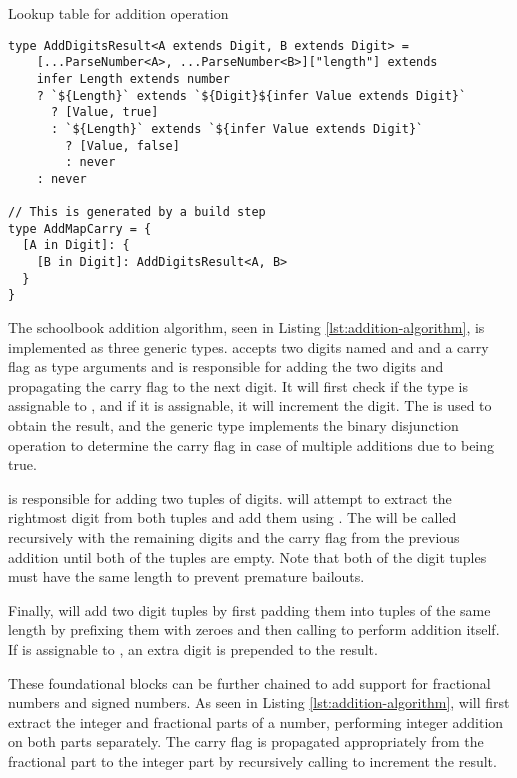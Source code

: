 \begin{listing}[ht]
  \caption{Lookup table for addition operation}\label{lst:generated-operations}
  \begin{verbatim}
type AddDigitsResult<A extends Digit, B extends Digit> =
    [...ParseNumber<A>, ...ParseNumber<B>]["length"] extends 
    infer Length extends number
    ? `${Length}` extends `${Digit}${infer Value extends Digit}`
      ? [Value, true]
      : `${Length}` extends `${infer Value extends Digit}`
        ? [Value, false]
        : never
    : never

// This is generated by a build step
type AddMapCarry = {
  [A in Digit]: {
    [B in Digit]: AddDigitsResult<A, B>
  }
}
\end{verbatim}
\end{listing}

The schoolbook addition algorithm, seen in Listing \ref{lst:addition-algorithm}, is implemented as three generic types.  accepts two digits named  and  and a carry flag as type arguments and is responsible for adding the two digits and propagating the carry flag to the next digit. It will first check if the  type is assignable to , and if it is assignable, it will increment the  digit. The  is used to obtain the result, and the  generic type implements the binary disjunction operation to determine the carry flag in case of multiple additions due to  being true.

 is responsible for adding two tuples of digits.  will attempt to extract the rightmost digit from both tuples and add them using . The  will be called recursively with the remaining digits and the carry flag from the previous addition until both of the tuples are empty. Note that both of the digit tuples must have the same length to prevent premature bailouts.

Finally,  will add two digit tuples by first padding them into tuples of the same length by prefixing them with zeroes and then calling  to perform addition itself. If  is assignable to , an extra  digit is prepended to the result.

These foundational blocks can be further chained to add support for fractional numbers and signed numbers. As seen in Listing \ref{lst:addition-algorithm},  will first extract the integer and fractional parts of a number, performing integer addition on both parts separately. The carry flag is propagated appropriately from the fractional part to the integer part by recursively calling  to increment the result.

